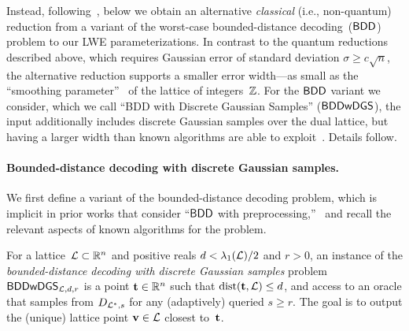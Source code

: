 \documentclass{iacrcc}
\begin{document}
Instead, following~\cite[Section~1.1]{Reg09}, below we obtain an
alternative \emph{classical} (i.e., non-quantum) reduction from a
variant of the worst-case bounded-distance decoding~($\mathsf{BDD}$) problem
to our LWE parameterizations. In contrast to the quantum reductions
described above, which requires Gaussian error of standard deviation
$\sigma \geq c \sqrt{n}$, the alternative reduction supports a
smaller error width---as small as the ``smoothing
parameter''~\cite{DBLP:journals/siamcomp/MicciancioR07} of the lattice
of integers~$\mathbb{Z}$.  For the $\mathsf{BDD}$ variant we consider, which we call
``BDD with Discrete Gaussian Samples'' ($\mathsf{BDDwDGS}$), the input
additionally includes discrete Gaussian samples over the dual lattice,
but having a larger width than known algorithms are able to
exploit~\cite{DBLP:conf/approx/LiuLM06,DBLP:conf/coco/DadushRS14}. Details
follow.


\paragraph{Bounded-distance decoding with discrete Gaussian samples.}


We first define a variant of the bounded-distance decoding problem,
which is implicit in prior works that consider ``$\mathsf{BDD}$ with
preprocessing,''~\cite{DBLP:journals/jacm/AharonovR05,DBLP:conf/approx/LiuLM06,DBLP:conf/coco/DadushRS14}
and recall the relevant aspects of known algorithms for the problem.

\begin{definition}
  \label{def:BDDwDGS}
  For a lattice~$\mathcal{L} \subset \mathbb{R}^{n}$ and positive reals
  $d < \lambda_{1}(\mathcal{L})/2$ and $r > 0$, an instance of the
  \emph{bounded-distance decoding with discrete Gaussian samples}
  problem $\mathsf{BDDwDGS}_{\mathcal{L},d,r}$ is a point $\mathbf{t} \in \mathbb{R}^{n}$ such that
  $\operatorname{dist}(\mathbf{t},\mathcal{L}) \leq d$, and access to an oracle that samples from
  $D_{\mathcal{L}^{*},s}$ for any (adaptively) queried $s \geq r$. The goal is
  to output the (unique) lattice point $\mathbf{v} \in \mathcal{L}$ closest to~$\mathbf{t}$.
\end{definition}
\end{document}
